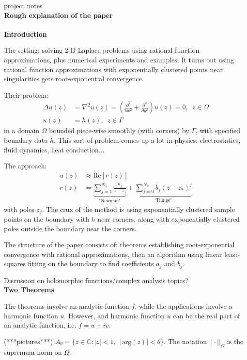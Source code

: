\documentclass[12]{article}
\begin{document}
  project notes\\
\large
\textbf{Rough explanation of the paper}\\ \\ \normalsize
\textbf{Introduction}

	The setting: solving 2-D Laplace problems using rational function approximations, plus numerical experiments and examples.
	It turns out using rational function approximations with exponentially clustered points near singularities gets root-exponential convergence.
	
	Their problem:
	\begin{align*}
	\Delta u(z) &= \nabla^2 u(z) = \left( \frac{\partial^2}{\partial x^2} + \frac{\partial^2}{\partial y^2}\right)u(z) = 0,\enspace z\in \Omega \\ 		u(z)&=h(z),\enspace z\in \Gamma
	\end{align*}
in a domain $\Omega$ bounded piece-wise smoothly (with corners) by $\Gamma$, with specified boundary data $h$. This sort of problem comes up a lot in physics: electrostatics, fluid dynamics, heat conduction...
	
	The approach:
	\begin{align*}
	u(z)&\approx \mathrm{Re}[r(z)] \\
	r(z) &= \underbrace{\sum_{j=1}^{N_1} \frac{a_j}{z-z_j}}_\text{"Newman"} + \underbrace{\sum_{j=0}^{N_2} b_j (z-z_*)^j}_\text{"Runge"}
	\end{align*}
with poles ${z_j}$. The crux of the method is using exponentially clustered sample points on the boundary with $h$ near corners, along with exponentially clustered poles outside the boundary near the corners.
	
	The structure of the paper consists of: theorems establishing root-exponential convergence with rational approximations, then an algorithm using linear least-squares fitting on the boundary to find coefficients $a_j$ and $b_j$. 
	
	Discussion on holomorphic functions/complex analysis topics?\\ 
	
\noindent
\textbf{Two Theorems}

	The theorems involve an analytic function $f$, while the applications involve a harmonic function $u$. However, and harmonic function $u$ can be the real part of an analytic function, i.e. $f=u+i v$.
	
	(***pictures***) $A_\theta=\{z \in \mathds{C} : |z|<1,\enspace |\mathrm{arg}(z)|<\theta \}$. The notation $||\cdot ||_\Omega$ is the supremum norm on $\Omega$.
	
\end{document}

